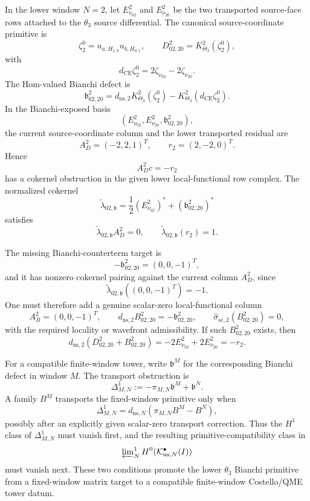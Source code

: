 \begin{prop}
\label{prop:app-theta-three-bianchi-lower-condition}
  In the lower window \(N=2\), let
  \(E^2_{\nu_{02}}\) and \(E^2_{\nu_{20}}\) be the two transported
  source-face rows attached to the \(\theta_3\) source differential.  The
  canonical source-coordinate primitive is
  \[
    \zeta^0_2=u_{a,H_{1,0}}u_{b,H_{0,1}},
    \qquad
    D^2_{02,20}=K^2_{\Theta_3}(\zeta^0_2),
  \]
  with
  \[
    d_{\mathrm{CE}}\zeta^0_2
      =
    2\zeta_{\nu_{02}}-2\zeta_{\nu_{20}} .
  \]
  The Hom-valued Bianchi defect is
  \[
    \mathfrak b^2_{02,20}
      =
    d_{\mathrm{ns},2}K^2_{\Theta_3}(\zeta^0_2)
      -
    K^2_{\Theta_3}(d_{\mathrm{CE}}\zeta^0_2).
  \]
  In the Bianchi-exposed basis
  \[
    (E^2_{\nu_{02}},E^2_{\nu_{20}},\mathfrak b^2_{02,20}),
  \]
  the current source-coordinate column and the lower transported residual
  are
  \[
    A_D^2=(-2,2,1)^T,\qquad r_2=(2,-2,0)^T .
  \]
  Hence
  \[
    A_D^2c=-r_2
  \]
  has a cokernel obstruction in the given lower local-functional row complex.  The
  normalized cokernel
  \[
    \widetilde\lambda_{02,\mathfrak b}
      =
    \frac12(E^2_{\nu_{02}})^*
      +(\mathfrak b^2_{02,20})^*
  \]
  satisfies
  \[
    \widetilde\lambda_{02,\mathfrak b}A_D^2=0,\qquad
    \widetilde\lambda_{02,\mathfrak b}(r_2)=1 .
  \]

  The missing Bianchi-counterterm target is
  \[
    -\mathfrak b^2_{02,20}=(0,0,-1)^T,
  \]
  and it has nonzero cokernel pairing against the current column \(A_D^2\), since
  \[
    \widetilde\lambda_{02,\mathfrak b}((0,0,-1)^T)=-1 .
  \]
  One must therefore add a genuine scalar-zero local-functional
  column
  \[
    A_B^2=(0,0,-1)^T,\qquad
    d_{\mathrm{ns},2}B^2_{02,20}
      =
    -\mathfrak b^2_{02,20},
    \qquad
    \widehat\sigma_{\mathrm{sc},2}(B^2_{02,20})=0,
  \]
  with the required locality or wavefront admissibility.  If such
  \(B^2_{02,20}\) exists, then
  \[
    d_{\mathrm{ns},2}(D^2_{02,20}+B^2_{02,20})
      =
    -2E^2_{\nu_{02}}+2E^2_{\nu_{20}}
      =
    -r_2 .
  \]

  For a compatible finite-window tower, write
  \(\mathfrak b^M\) for the corresponding Bianchi defect in window \(M\).
  The transport obstruction is
  \[
    \Delta^1_{M,N}
      :=
    -\pi_{M,N}\mathfrak b^M+\mathfrak b^N .
  \]
  A family \(B^M\) transports the fixed-window primitive only when
  \[
    \Delta^1_{M,N}
      =
    d_{\mathrm{ns},N}(\pi_{M,N}B^M-B^N),
  \]
  possibly after an explicitly given scalar-zero transport correction.
  Thus the \(H^1\) class of \(\Delta^1_{M,N}\) must vanish first, and the
  resulting primitive-compatibility class in
  \[
    \varprojlim\nolimits^1_N
    H^0(\mathcal K^\bullet_{\mathrm{ns},N}(I))
  \]
  must vanish next.  These two conditions promote the lower \(\theta_3\)
  Bianchi primitive from a fixed-window matrix target to a compatible
  finite-window Costello/QME tower datum.
\end{prop}

